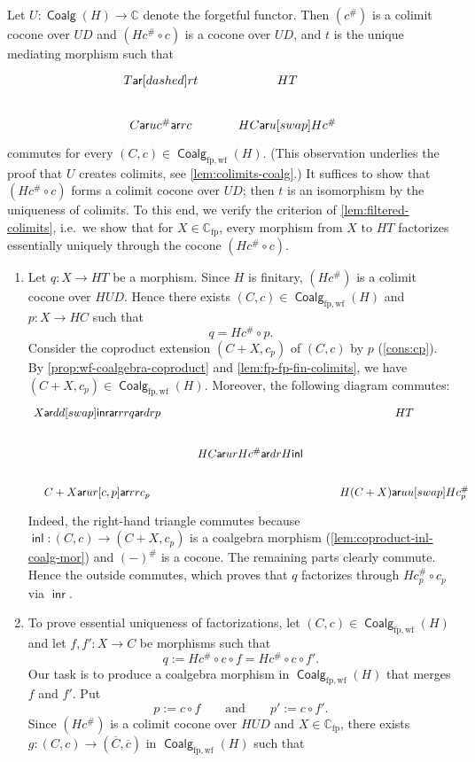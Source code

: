 \documentclass[10pt,a4paper]{article}
\theoremstyle{definition}
\theoremstyle{remark}
\numberwithin{equation}{section}
\providecommand{\oname}[1]{{\mathop{\mathsf{#1}}\xspace}}
\providecommand{\inl}{\oname{inl}}
\providecommand{\inr}{\oname{inr}}
\newcommand{\qqand}{\qquad\text{and}\qquad}
\newcommand{\ar}{\mathsf{ar}}
\newcommand{\ol}{\overline}
\providecommand{\C}{}
\newcommand{\fp}{{\mathrm{fp}}}
\newcommand{\wf}{{\mathrm{wf}}}
\newcommand{\fwf}{\Coalg_{\fp,\wf}(H)}
\renewcommand{\C}{{\mathbb{C}}}
\DeclareMathOperator{\Coalg}{\mathsf{Coalg}}
\newenvironment{proofhere}[2][Proof of]{    \proof{#1~\autoref{#2}}    }{  \endproof  \par}
\newenvironment{proofappendix}[2][Proof of]{    \begin{proofhere}[#1]{#2}\label{#2:proof}
  }{    \end{proofhere}
  }
\theoremstyle{plain}
\theoremstyle{definition}
\begin{document}
\begin{proofappendix}{lem:t-iso-wf}
Let $U\colon \Coalg(H)\to \C$ denote the forgetful functor. Then $(c^\#)$ is a colimit cocone over $UD$ and $(Hc^\#\circ c)$ is a cocone over $UD$, and $t$ is the unique mediating morphism such that
\[  
\begin{tikzcd}
T \ar[dashed]{r}{t} & HT \\
C \ar{u}{c^\#} \ar{r}{c} & HC \ar{u}[swap]{Hc^\#}
\end{tikzcd}
\]
commutes for every $(C,c)\in \fwf$. (This observation underlies the proof that $U$ creates colimits, see \autoref{lem:colimits-coalg}.) It suffices to show that $(Hc^\#\circ c)$ forms a colimit cocone over $UD$; then $t$ is an isomorphism by the uniqueness of colimits. To this end, we verify the criterion of \autoref{lem:filtered-colimits}, i.e.\ we show that for $X\in \C_\fp$, every morphism from $X$ to $HT$ factorizes essentially uniquely through the cocone $(Hc^\# \circ c)$.
\begin{enumerate}
\item Let $q\colon X\to HT$ be a morphism. Since $H$ is finitary, $(Hc^\#)$ is a colimit cocone over $HUD$. Hence there exists $(C,c)\in \fwf$  and $p\colon X\to HC$ such that
\[ q=Hc^\# \circ p. \]
Consider the coproduct extension $(C+X,c_p)$ of $(C,c)$ by $p$ (\autoref{cons:cp}). By \autoref{prop:wf-coalgebra-coproduct} and \autoref{lem:fp-fp-fin-colimits}, we have $(C+X,c_p)\in \fwf$. Moreover, the following diagram commutes:
\[
\begin{tikzcd}
X \ar{dd}[swap]{\inr} \ar{rr}{q} \ar{dr}{p} & & HT \\
& HC \ar{ur}{Hc^\#} \ar{dr}{H\inl} & \\
C+X \ar{ur}{[c,p]} \ar{rr}{c_p} & & H(C+X) \ar{uu}[swap]{Hc_p^\#}
\end{tikzcd}
\]
Indeed, the right-hand triangle commutes because $\inl\colon (C,c)\to (C+X,c_p)$ is a coalgebra morphism (\autoref{lem:coproduct-inl-coalg-mor}) and $(-)^\#$ is a cocone. The remaining parts clearly commute. Hence the outside commutes, which proves that $q$ factorizes through $Hc_p^\# \circ c_p$ via $\inr$.
\item To prove essential uniqueness of factorizations, let $(C,c)\in \fwf$ and let $f,f'\colon X\to C$ be morphisms such that 
\[ q:= Hc^\# \circ c \circ f = Hc^\# \circ c \circ f'.\]
Our task is to produce a coalgebra morphism in $\fwf$ that merges $f$ and $f'$. Put
\[ p:=c \circ f\qqand p':=c\circ f'.  \]
 Since $(Hc^\#)$ is a colimit cocone over $HUD$ and $X\in \C_\fp$, there exists $g\colon (C,c)\to (\ol{C},\ol{c})$ in $\fwf$ such that  

\end{enumerate}
\end{proofappendix}
\end{document}
